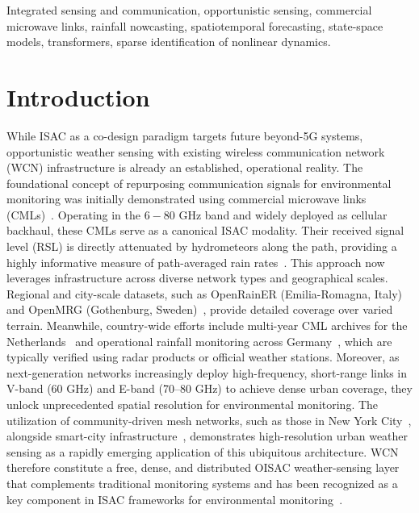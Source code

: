 \documentclass[conference]{IEEEtran}
\begin{document}
\begin{IEEEkeywords}
Integrated sensing and communication, opportunistic sensing, commercial
microwave links, rainfall nowcasting, spatiotemporal forecasting,
state-space models, transformers, sparse identification of nonlinear
dynamics.
\end{IEEEkeywords}

\section{Introduction}
\label{sec:intro}
While ISAC as a co-design paradigm targets future beyond-5G systems, opportunistic weather sensing with existing wireless communication network (WCN) infrastructure is already an established, operational reality. The foundational concept of repurposing communication signals for environmental monitoring was initially demonstrated using commercial microwave links (CMLs)~\cite{messer2006}. Operating in the $6-80$ GHz band and widely deployed as cellular backhaul, these CMLs serve as a canonical ISAC modality. Their received signal level (RSL) is directly attenuated by hydrometeors along the path, providing a highly informative measure of path-averaged rain rates~\cite{leijnse2007,overeem2013}. This approach now leverages infrastructure across diverse network types and geographical scales. Regional and city-scale datasets, such as OpenRainER (Emilia-Romagna, Italy)~\cite{covi2026openrainer} and OpenMRG (Gothenburg, Sweden)~\cite{andersson2022openmrg}, provide detailed coverage over varied terrain. Meanwhile, country-wide efforts include multi-year CML archives for the Netherlands~\cite{overeem2024netherlands} and operational rainfall monitoring across Germany~\cite{graf2020rainfall}, which are typically verified using radar products or official weather stations. Moreover, as next-generation networks increasingly deploy high-frequency, short-range links in V-band (60 GHz) and E-band (70–80 GHz) to achieve dense urban coverage, they unlock unprecedented spatial resolution for environmental monitoring. The utilization of community-driven mesh networks, such as those in New York City~\cite{jacoby2025openmesh}, alongside smart-city infrastructure~\cite{hadar2020parameter,ostrometzky2024opportunistic}, demonstrates high-resolution urban weather sensing as a rapidly emerging application of this ubiquitous architecture. WCN therefore constitute a free, dense, and distributed OISAC weather-sensing layer that complements traditional monitoring systems and has been recognized as a key component in ISAC frameworks for environmental monitoring~\cite{messer2006,cui2023integrated}.
\end{document}
